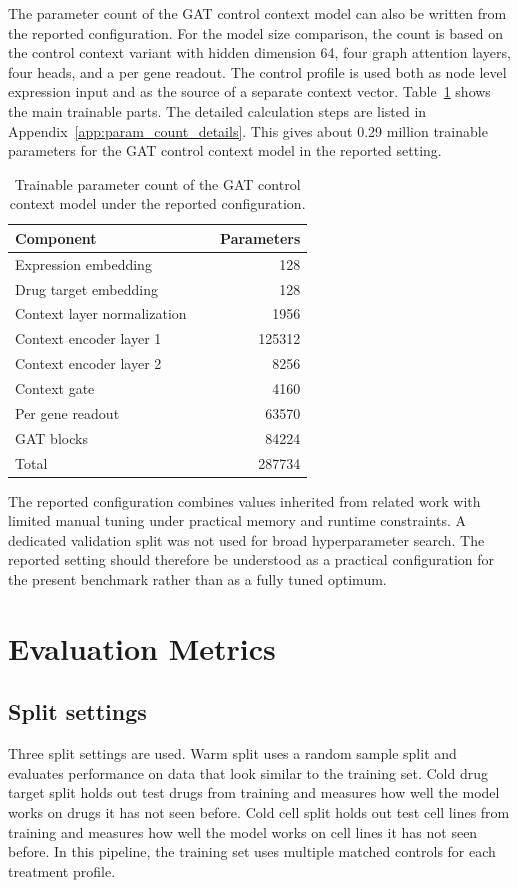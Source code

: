 \noindent The parameter count of the GAT control context model can also be written from the reported configuration. For the model size comparison, the count is based on the control context variant with hidden dimension 64, four graph attention layers, four heads, and a per gene readout. The control profile is used both as node level expression input and as the source of a separate context vector. Table~\ref{tab:cagnn_param_count} shows the main trainable parts. The detailed calculation steps are listed in Appendix~\ref{app:param_count_details}. This gives about 0.29 million trainable parameters for the GAT control context model in the reported setting.
\begin{table}[htbp]
    \centering
    \caption[Proposed Model Parameter Count]{Trainable parameter count of the GAT control context model under the reported configuration.}
    \label{tab:cagnn_param_count}
    \begin{tabular}{p{0.62\linewidth}r}
        \hline
        Component & Parameters \\
        \hline
        Expression embedding & 128 \\
        Drug target embedding & 128 \\
        Context layer normalization & 1956 \\
        Context encoder layer 1 & 125312 \\
        Context encoder layer 2 & 8256 \\
        Context gate & 4160 \\
        Per gene readout & 63570 \\
        GAT blocks & 84224 \\
        \hline
        Total & 287734 \\
        \hline
    \end{tabular}
\end{table}


\noindent The reported configuration combines values inherited from related work with limited manual tuning under practical memory and runtime constraints. A dedicated validation split was not used for broad hyperparameter search. The reported setting should therefore be understood as a practical configuration for the present benchmark rather than as a fully tuned optimum.
\section{Evaluation Metrics}
\subsection{Split settings}
\noindent Three split settings are used. Warm split uses a random sample split and evaluates performance on data that look similar to the training set. Cold drug target split holds out test drugs from training and measures how well the model works on drugs it has not seen before. Cold cell split holds out test cell lines from training and measures how well the model works on cell lines it has not seen before. In this pipeline, the training set uses multiple matched controls for each treatment profile.

